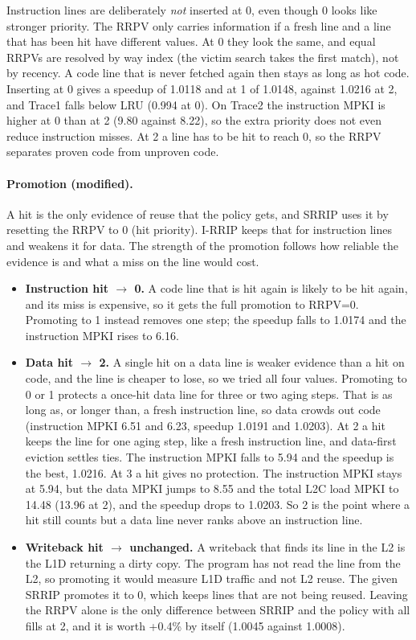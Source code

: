 \documentclass[11pt,a4paper]{article}
\begin{document}
Instruction lines are deliberately \emph{not} inserted at 0, even though 0 looks like stronger
priority. The RRPV only carries information if a fresh line and a line that has been hit
have different values. At 0 they look the same, and equal RRPVs are resolved by way index (the
victim search takes the first match), not by recency. A code line that is never fetched again then
stays as long as hot code. Inserting at 0 gives a speedup of 1.0118 and at 1 of 1.0148, against 1.0216
at 2, and Trace1 falls below LRU (0.994 at 0). On Trace2 the instruction MPKI is higher at 0 than at 2 (9.80 against 8.22), so the extra priority
does not even reduce instruction misses. At 2 a line has to be hit to reach 0, so the RRPV separates proven
code from unproven code.

\paragraph{Promotion (modified).} A hit is the only evidence of reuse that the policy gets, and
SRRIP uses it by resetting the RRPV to 0 (hit priority). I-RRIP keeps that for instruction lines
and weakens it for data. The strength of the promotion follows how reliable the evidence is and what a miss on
the line would cost.
\begin{itemize}
    \item \textbf{Instruction hit $\to$ 0.} A code line that is hit again is likely to be hit again,
          and its miss is expensive, so it gets the full promotion to RRPV=0.
          Promoting to 1 instead removes one step; the speedup falls to 1.0174 and the instruction MPKI rises
          to 6.16.
    \item \textbf{Data hit $\to$ 2.} A single hit on a data line is weaker evidence than a hit on code,
          and the line is cheaper to lose, so we tried all four values.
          Promoting to 0 or 1 protects a once-hit data line for three or two aging steps. That is as long
          as, or longer than, a fresh instruction line, so data crowds out code (instruction MPKI 6.51 and 6.23,
          speedup 1.0191 and 1.0203). At 2 a hit keeps the line for one aging step, like a fresh instruction line,
          and data-first eviction settles ties. The instruction MPKI falls to 5.94 and the speedup is the
          best, 1.0216. At 3 a hit gives no protection. The instruction MPKI stays at 5.94, but the data MPKI
          jumps to 8.55 and the total L2C load MPKI to 14.48 (13.96 at 2), and the speedup drops to 1.0203.
          So 2 is the point where a hit still counts but a data line never ranks above an instruction line.
    \item \textbf{Writeback hit $\to$ unchanged.} A writeback that finds its line in the L2 is the L1D
          returning a dirty copy. The program has not read the line from the L2, so promoting it would
          measure L1D traffic and not L2 reuse. The given SRRIP promotes it to 0, which keeps lines
          that are not being reused. Leaving the RRPV alone is the only difference between SRRIP and the policy
          with all fills at 2, and it is worth +0.4\% by itself (1.0045 against 1.0008).
\end{itemize}
\end{document}
